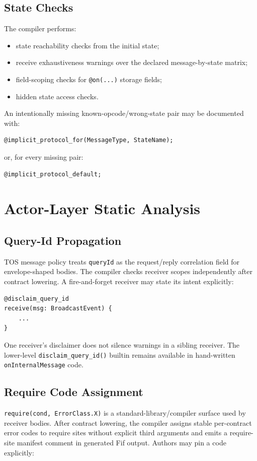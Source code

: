 \documentclass[12pt,oneside]{article}
\begin{document}
\subsection{State Checks}
The compiler performs:

\begin{itemize}
\item state reachability checks from the initial state;
\item receive exhaustiveness warnings over the declared message-by-state matrix;
\item field-scoping checks for \verb|@on(...)| storage fields;
\item hidden state access checks.
\end{itemize}

An intentionally missing known-opcode/wrong-state pair may be documented with:

\begin{verbatim}
@implicit_protocol_for(MessageType, StateName);
\end{verbatim}

or, for every missing pair:

\begin{verbatim}
@implicit_protocol_default;
\end{verbatim}

\section{Actor-Layer Static Analysis}
\label{sec:actor-static-analysis}
\subsection{Query-Id Propagation}
TOS message policy treats \verb|queryId| as the request/reply correlation
field for envelope-shaped bodies. The compiler checks receiver scopes
independently after contract lowering. A fire-and-forget receiver may state its
intent explicitly:

\begin{verbatim}
@disclaim_query_id
receive(msg: BroadcastEvent) {
    ...
}
\end{verbatim}

One receiver's disclaimer does not silence warnings in a sibling receiver.
The lower-level \verb|disclaim_query_id()| builtin remains available in
hand-written \verb|onInternalMessage| code.

\subsection{Require Code Assignment}
\verb|require(cond, ErrorClass.X)| is a standard-library/compiler surface used
by receiver bodies. After contract lowering, the compiler assigns stable
per-contract error codes to require sites without explicit third arguments and
emits a require-site manifest comment in generated Fif output. Authors may pin
a code explicitly:
\end{document}

